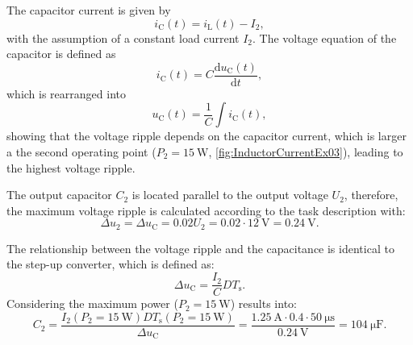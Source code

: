 \begin{solutionblock}
    The capacitor current is given by
    \begin{equation}
        i_{\mathrm{C}}(t) = i_{\mathrm{L}}(t)-I_{\mathrm{2}},
    \end{equation}
    with the assumption of a constant load current $I_2$.
    The voltage equation of the capacitor is defined as
    \begin{equation}
        i_{\mathrm{C}}(t) = C\frac{\mathrm{d}u_{\mathrm{C}}(t)}{\mathrm{d}t},
    \end{equation}
    which is rearranged into
    \begin{equation}
        u_{\mathrm{C}}(t) = \frac{1}{C} \int i_{\mathrm{C}}(t),
    \end{equation}
    showing that the voltage ripple depends on the capacitor current, which is larger a the second operating point ($P_2 = \SI{15}{\watt}$, \autoref{fig:InductorCurrentEx03}), leading to the highest voltage ripple.
\end{solutionblock}


\begin{solutionblock}
    The output capacitor $C_2$ is located parallel to the output voltage $U_2$, therefore, the maximum voltage ripple is calculated according to the task description with:
    \begin{equation}
        \Delta u_2 = \Delta u_{\mathrm{C}} = 0.02 U_2 = 0.02 \cdot \SI{12}{\volt} = \SI{0.24}{\volt}.
    \end{equation}

    The relationship between the voltage ripple and the capacitance is identical to the step-up converter, which is defined as:
    \begin{equation}
        \Delta u_{\mathrm{C}} = \frac{I_2}{C} D T_{\mathrm{s}}.
    \end{equation}
    Considering the maximum power ($P_2 = \SI{15}{\watt}$) results into:
    \begin{equation}
        C_2 = \frac{I_{\mathrm{2}}(P_\mathrm{2}=\SI{15}{\watt}) D T_{\mathrm{s}}(P_\mathrm{2}=\SI{15}{\watt})}{\Delta u_{\mathrm{C}}}
        = \frac{\SI{1.25}{\ampere} \cdot 0.4 \cdot \SI{50}{\micro\second}}{\SI{0.24}{\volt}}
        = \SI{104}{\micro\farad}. 
    \end{equation}

\end{solutionblock}

